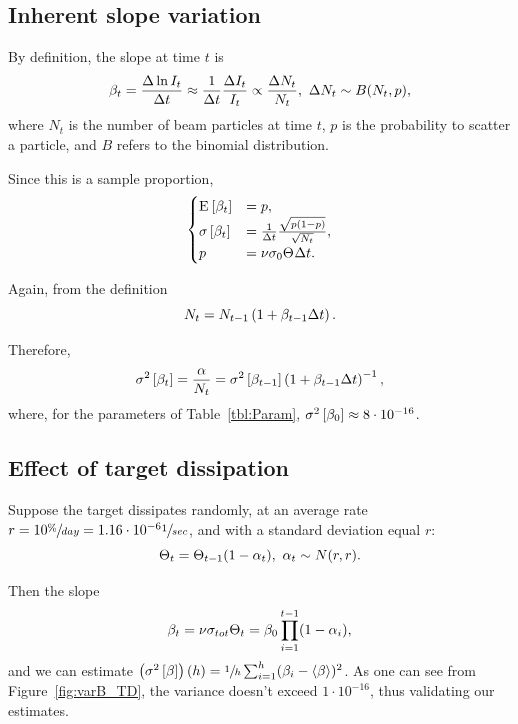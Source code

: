 \documentclass{article}
\begin{document}
\subsection{Inherent slope variation}
By definition, the slope at time $t$ is
\[
 \slp[t] = \frac{\Delta \ln I_t}{\Delta t} \approx \frac{1}{\Delta t}\frac{\Delta I_t}{I_t} \propto \frac{\Delta N_t}{N_t}, ~\Delta N_t \sim B(N_t, p),
\]
where $N_t$ is the number of beam particles at time $t$, $p$ is the probability to scatter a particle, and $B$ refers to the binomial distribution.

Since this is a sample proportion, 
\begin{equation*}
\begin{cases}
	\Xpct{\slp[t]} 	&= p, \\
	\SE{\slp[t]}		&= \frac{1}{\Delta t}\frac{\sqrt{p(1-p)}}{\sqrt{N_t}}, \\
	p 				&= \nu\CS[0]\Thick\Delta t.
\end{cases}
\end{equation*}

Again, from the definition
\[
	N_t = N_{t-1}\bkt{1 + \slp[t-1]\Delta t}.
\]

Therefore, 
\begin{equation}
\v{\slp[t]} = \frac{\alpha}{N_t} = \v{\slp[t-1]}\bkt{1 + \slp[t-1]\Delta t}^{-1},
\end{equation}
where, for the parameters of Table~\ref{tbl:Param}, $\v{\slp[0]} \approx 8\cdot10^{-16}$.

\subsection{Effect of target dissipation}
Suppose the target dissipates randomly, at an average rate $r = 10\sfrac{\%}{day} = 1.16\cdot10^{-6}\sfrac{1}{sec}$, and with a standard deviation equal $r$:
\[
	\Thick[t] = \Thick[t-1](1-\alpha_t),~ \alpha_t\sim N(r,r).
\]

Then the slope
\[
	\slp[t] = \nu\CS[tot]\Thick[t] = \slp[0]\prod_{i=1}^{t-1}(1-\alpha_i),
\]	
and we can estimate $\bkt{\v{\slp}}(h) = \sfrac 1h \sum_{i=1}^{h}(\slp[i] - \avg{\slp})^2$. As one can see from Figure~\ref{fig:varB_TD}, the variance doesn't exceed $1\cdot10^{-16}$, thus validating our estimates.
\end{document}
